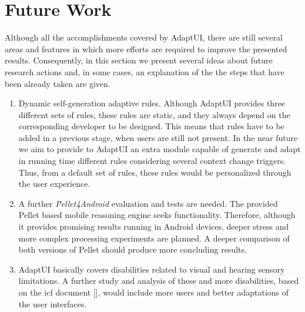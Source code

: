 \section{Future Work}
\label{sec:future_work}

Although all the accomplishments covered by AdaptUI, there are still several 
areas and features in which more efforts are required to improve the presented 
results. Consequently, in this section we present several ideas about future 
research actions and, in some cases, an explanation of the the steps that have 
been already taken are given.

\begin{enumerate}[label=\alph*)]
  \item Dynamic self-generation adaptive rules. Although AdaptUI provides three 
  different sets of rules, these rules are static, and they always depend on 
  the corresponding developer to be designed. This means that rules have to 
  be added in a previous stage, when users are still not present. In the near 
  future we aim to provide to AdaptUI an extra module capable of generate and 
  adapt in running time different rules considering several context change 
  triggers. Thus, from a default set of rules, these rules would be personalized 
  through the user experience.
  
  \item A further \textit{Pellet4Android} evaluation and tests are needed. The
  provided Pellet based mobile reasoning engine seeks functionality. Therefore,
  although it provides promising results running in Android devices, deeper 
  stress and  more complex processing experiments are planned. A deeper
  comparison of both versions of Pellet should produce more concluding results.
  
  \item AdaptUI basically covers disabilities related to visual and hearing
  sensory limitations. A further study and analysis of these and more 
  disabilities, based on the \ac{icf} document [], would include more users and 
  better adaptations of the user interfaces.
\end{enumerate}